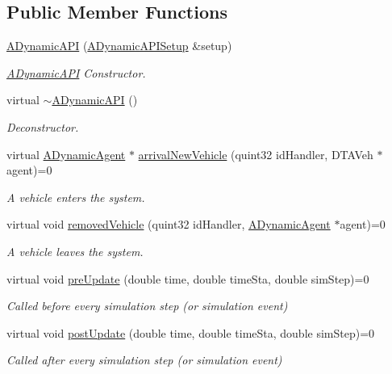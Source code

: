 \subsection*{Public Member Functions}
\begin{DoxyCompactItemize}
\item 
\hyperlink{classADynamicAPI_a0791cdc47d83c1c2cb8fcca9318ea1b4}{A\+Dynamic\+A\+PI} (\hyperlink{classADynamicAPISetup}{A\+Dynamic\+A\+P\+I\+Setup} \&setup)
\begin{DoxyCompactList}\small\item\em \hyperlink{classADynamicAPI}{A\+Dynamic\+A\+PI} Constructor. \end{DoxyCompactList}\item 
virtual \hyperlink{classADynamicAPI_a4f3e3112b0e1d679865e20c69597c2ba}{$\sim$\+A\+Dynamic\+A\+PI} ()\hypertarget{classADynamicAPI_a4f3e3112b0e1d679865e20c69597c2ba}{}\label{classADynamicAPI_a4f3e3112b0e1d679865e20c69597c2ba}

\begin{DoxyCompactList}\small\item\em Deconstructor. \end{DoxyCompactList}\item 
virtual \hyperlink{classADynamicAgent}{A\+Dynamic\+Agent} $\ast$ \hyperlink{classADynamicAPI_a9515f56fba44ad8f5aeaeca1b5091b14}{arrival\+New\+Vehicle} (quint32 id\+Handler, D\+T\+A\+Veh $\ast$agent)=0
\begin{DoxyCompactList}\small\item\em A vehicle enters the system. \end{DoxyCompactList}\item 
virtual void \hyperlink{classADynamicAPI_a6f4148dd485116a83caba071ea6a688f}{removed\+Vehicle} (quint32 id\+Handler, \hyperlink{classADynamicAgent}{A\+Dynamic\+Agent} $\ast$agent)=0
\begin{DoxyCompactList}\small\item\em A vehicle leaves the system. \end{DoxyCompactList}\item 
virtual void \hyperlink{classADynamicAPI_ab00f0ff26b69cae13d72d2d84cc8174b}{pre\+Update} (double time, double time\+Sta, double sim\+Step)=0
\begin{DoxyCompactList}\small\item\em Called before every simulation step (or simulation event) \end{DoxyCompactList}\item 
virtual void \hyperlink{classADynamicAPI_ab70821f058585820cfbc9287946642da}{post\+Update} (double time, double time\+Sta, double sim\+Step)=0
\begin{DoxyCompactList}\small\item\em Called after every simulation step (or simulation event) \end{DoxyCompactList}\end{DoxyCompactItemize}


